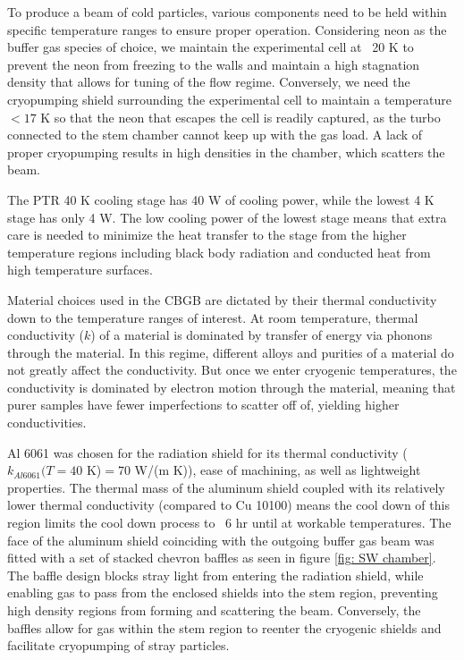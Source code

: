 To produce a beam of cold particles, various components need to be held within specific temperature ranges to ensure proper operation. Considering neon as the buffer gas species of choice, we maintain the experimental cell at ~20 K to prevent the neon from freezing to the walls and maintain a high stagnation density that allows for tuning of the flow regime. Conversely, we need the cryopumping shield surrounding the experimental cell to maintain a temperature $<17$ K so that the neon that escapes the cell is readily captured, as the turbo connected to the stem chamber cannot keep up with the gas load. A lack of proper cryopumping results in high densities in the chamber, which scatters the beam.

The PTR 40 K cooling stage has 40 W of cooling power, while the lowest 4 K stage has only 4 W. The low cooling power of the lowest stage means that extra care is needed to minimize the heat transfer to the stage from the higher temperature regions including black body radiation and conducted heat from high temperature surfaces.

Material choices used in the CBGB are dictated by their thermal conductivity down to the temperature ranges of interest. At room temperature, thermal conductivity ($k$) of a material is dominated by transfer of energy via phonons through the material. In this regime, different alloys and purities of a material do not greatly affect the conductivity. But once we enter cryogenic temperatures, the conductivity is dominated by electron motion through the material, meaning that purer samples have fewer imperfections to scatter off of, yielding higher conductivities.

Al 6061 was chosen for the radiation shield for its thermal conductivity ($k_{Al6061}(T=40$ K)$ = 70$ W/(m K)\cite{NIST}), ease of machining, as well as lightweight properties. The thermal mass of the aluminum shield coupled with its relatively lower thermal conductivity (compared to Cu 10100) means the cool down of this region limits the cool down process to ~6 hr until at workable temperatures. The face of the aluminum shield coinciding with the outgoing buffer gas beam was fitted with a set of stacked chevron baffles as seen in figure \ref{fig: SW chamber}. The baffle design blocks stray light from entering the radiation shield, while enabling gas to pass from the enclosed shields into the stem region, preventing high density regions from forming and scattering the beam. Conversely, the baffles allow for gas within the stem region to reenter the cryogenic shields and facilitate cryopumping of stray particles.


